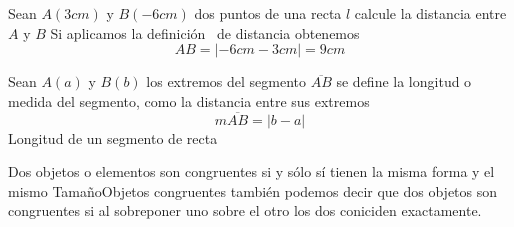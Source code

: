 \documentclass[12pt]{book}
\begin{document}
\begin{ejemplo}{Sean $A\left( 3\unit{cm}\right) $ y $B\left( -6\unit{cm}\right) $ dos puntos
de una recta $l$ calcule la distancia entre $A$ y $B$}
\solucion Si aplicamos la definici\'{o}n \ de distancia obtenemos%
\begin{equation*}
AB=\left\vert -6\unit{cm}-3\unit{cm}\right\vert =9\unit{cm}
\end{equation*}
\end{ejemplo}
\begin{definicion}{Sean $A\left( a\right) $ y $B\left( b\right) $ los extremos del segmento $%
\overline{AB}$ se define la longitud o medida del segmento, como la distancia entre
sus extremos
\begin{equation*}
m\overline{AB}=\left\vert b-a\right\vert
\end{equation*}}{Longitud de un segmento de recta}
\end{definicion}
\begin{ideas}{Dos objetos o elementos son congruentes si y sólo sí
tienen la misma forma y el mismo Tamaño}{Objetos congruentes}
también podemos decir que dos objetos son congruentes si al sobreponer uno sobre el otro
los dos coniciden exactamente.
 \end{ideas}
\end{document}
